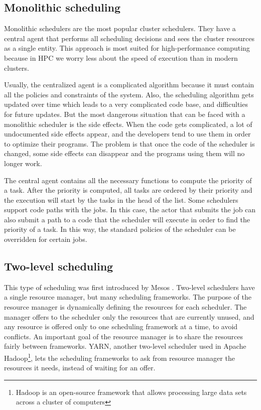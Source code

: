 \documentclass[11pt]{article}
\begin{document}
	\subsection{Monolithic scheduling}
    
        Monolithic schedulers are the most popular cluster schedulers. They have a central agent that performs all scheduling decisions and sees the cluster resources as a single entity. This approach is most suited for high-performance computing because in HPC we worry less about the speed of execution than in modern clusters. 
        
        Usually, the centralized agent is a complicated algorithm because it must contain all the policies and constraints of the system. Also, the scheduling algorithm gets updated over time which leads to a very complicated code base, and difficulties for future updates. But the most dangerous situation that can be faced with a monolithic scheduler is the side effects. When the code gets complicated, a lot of undocumented side effects appear, and the developers tend to use them in order to optimize their programs. The problem is that once the code of the scheduler is changed, some side effects can disappear and the programs using them will no longer work.
        
        The central agent contains all the necessary functions to compute the priority of a task. After the priority is computed, all tasks are ordered by their priority and the execution will start by the tasks in the head of the list. Some schedulers support code paths with the jobs. In this case, the actor that submits the job can also submit a path to a code that the scheduler will execute in order to find the priority of a task. In this way, the standard policies of the scheduler can be overridden for certain jobs.
        
       
	\subsection{Two-level scheduling}
    
    	This type of scheduling was first introduced by Mesos \cite{mesos}. Two-level schedulers have a single resource manager, but many scheduling frameworks. The purpose of the resource manager is dynamically defining the resources for each scheduler. The manager offers to the scheduler only the resources that are currently unused, and any resource is offered only to one scheduling framework at a time, to avoid conflicts. An important goal of the resource manager is to share the resources fairly between frameworks. YARN, another two-level scheduler used in Apache Hadoop\footnote{Hadoop is an open-source framework that allows processing large data sets across a cluster of computers}, lets the scheduling frameworks to ask from resource manager the resources it needs, instead of waiting for an offer.
        
\end{document}
